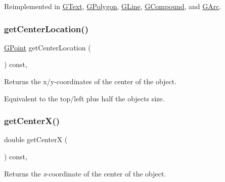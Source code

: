 Reimplemented in \mbox{\hyperlink{classsgl_1_1GText_a89040ce9277825772d359fccd33bca86}{G\+Text}}, \mbox{\hyperlink{classsgl_1_1GPolygon_a89040ce9277825772d359fccd33bca86}{G\+Polygon}}, \mbox{\hyperlink{classsgl_1_1GLine_a89040ce9277825772d359fccd33bca86}{G\+Line}}, \mbox{\hyperlink{classsgl_1_1GCompound_a89040ce9277825772d359fccd33bca86}{G\+Compound}}, and \mbox{\hyperlink{classsgl_1_1GArc_a89040ce9277825772d359fccd33bca86}{G\+Arc}}.

\mbox{\label{classsgl_1_1GObject_a0909472e91448470bccdb62ecfb95d8b}} 
\subsubsection{\texorpdfstring{get\+Center\+Location()}{getCenterLocation()}}
{\footnotesize\ttfamily \mbox{\hyperlink{structsgl_1_1GPoint}{G\+Point}} get\+Center\+Location (\begin{DoxyParamCaption}{ }\end{DoxyParamCaption}) const\hspace{0.3cm}{\ttfamily [virtual]}, {\ttfamily [inherited]}}



Returns the x/y-\/coordinates of the center of the object. 

Equivalent to the top/left plus half the object\textquotesingle{}s size. \mbox{\label{classsgl_1_1GObject_a04df74355b545e0543112d5b8d924176}} 
\subsubsection{\texorpdfstring{get\+Center\+X()}{getCenterX()}}
{\footnotesize\ttfamily double get\+CenterX (\begin{DoxyParamCaption}{ }\end{DoxyParamCaption}) const\hspace{0.3cm}{\ttfamily [virtual]}, {\ttfamily [inherited]}}



Returns the {\itshape x}-\/coordinate of the center of the object. 

